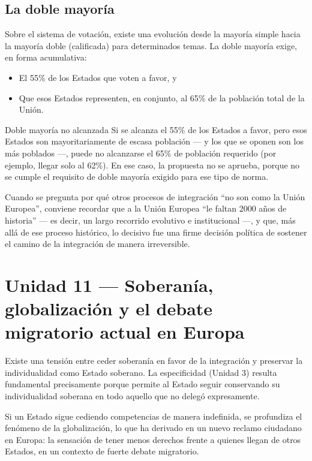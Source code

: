 \documentclass[12pt,oneside]{book}
\begin{document}
\subsection*{La doble mayoría}

Sobre el sistema de votación, existe una evolución desde la mayoría simple hacia la mayoría doble (calificada) para determinados temas. La doble mayoría exige, en forma acumulativa:

\begin{itemize}
    \item El 55\% de los Estados que voten a favor, y
    \item Que esos Estados representen, en conjunto, al 65\% de la población total de la Unión.
\end{itemize}

\begin{example}{Doble mayoría no alcanzada}
Si se alcanza el 55\% de los Estados a favor, pero esos Estados son mayoritariamente de escasa población --- y los que se oponen son los más poblados ---, puede no alcanzarse el 65\% de población requerido (por ejemplo, llegar solo al 62\%). En ese caso, la propuesta no se aprueba, porque no se cumple el requisito de doble mayoría exigido para ese tipo de norma.
\end{example}

Cuando se pregunta por qué otros procesos de integración ``no son como la Unión Europea'', conviene recordar que a la Unión Europea ``le faltan 2000 años de historia'' --- es decir, un largo recorrido evolutivo e institucional ---, y que, más allá de ese proceso histórico, lo decisivo fue una firme decisión política de sostener el camino de la integración de manera irreversible.

\section{Unidad 11 --- Soberanía, globalización y el debate migratorio actual en Europa}

Existe una tensión entre ceder soberanía en favor de la integración y preservar la individualidad como Estado soberano. La especificidad (Unidad 3) resulta fundamental precisamente porque permite al Estado seguir conservando su individualidad soberana en todo aquello que no delegó expresamente.

Si un Estado sigue cediendo competencias de manera indefinida, se profundiza el fenómeno de la globalización, lo que ha derivado en un nuevo reclamo ciudadano en Europa: la sensación de tener menos derechos frente a quienes llegan de otros Estados, en un contexto de fuerte debate migratorio.
\end{document}

